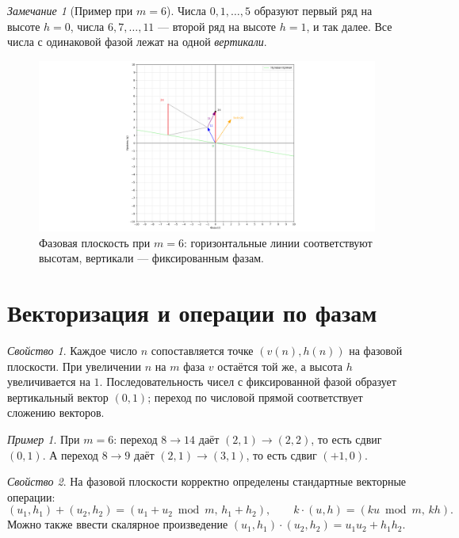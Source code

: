 \documentclass[12pt,a4paper]{article}
\theoremstyle{definition}
\theoremstyle{plain}
\theoremstyle{remark}
\newtheorem*{remark}{Замечание}
\newtheorem*{example}{Пример}
\newtheorem*{property}{Свойство}
\begin{document}
\begin{remark}[Пример при $m=6$]
Числа $0,1,\dots,5$ образуют первый ряд на высоте $h=0$,
числа $6,7,\dots,11$ — второй ряд на высоте $h=1$, и так далее.
Все числа с одинаковой фазой лежат на одной \emph{вертикали}.
\end{remark}

\begin{figure}[H]
\centering
\includegraphics[width=1\textwidth]{phase_plane.png}
\caption{Фазовая плоскость при $m=6$: горизонтальные линии соответствуют высотам,
вертикали — фиксированным фазам.}
\label{fig:phase-plane}
\end{figure}

\section{Векторизация и операции по фазам}

\begin{property}
Каждое число $n$ сопоставляется точке $(v(n),h(n))$ на фазовой плоскости.
При увеличении $n$ на $m$ фаза $v$ остаётся той же, а высота $h$ увеличивается на $1$.
Последовательность чисел с фиксированной фазой образует вертикальный
вектор $(0,1)$; переход по числовой прямой соответствует сложению векторов.
\end{property}

\begin{example}
При $m=6$: переход $8 \to 14$ даёт $(2,1)\to(2,2)$, то есть сдвиг $(0,1)$.
А переход $8 \to 9$ даёт $(2,1)\to(3,1)$, то есть сдвиг $(+1,0)$.
\end{example}

\begin{property}
На фазовой плоскости корректно определены стандартные векторные операции:
\[
(u_1,h_1)+(u_2,h_2)=(u_1+u_2 \bmod m,\,h_1+h_2),\qquad
k\cdot(u,h)=(ku \bmod m,\,kh).
\]
Можно также ввести скалярное произведение $(u_1,h_1)\cdot(u_2,h_2)=u_1u_2+h_1h_2$.
\end{property}
\end{document}
